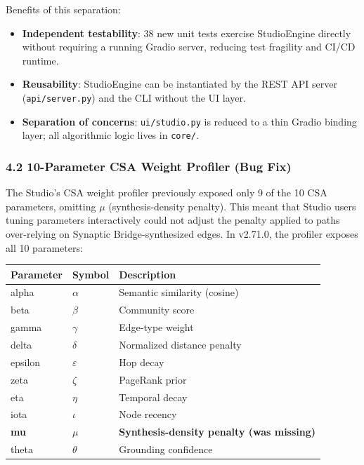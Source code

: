 Benefits of this separation:
\begin{itemize}
  \item \textbf{Independent testability}: 38 new unit tests exercise StudioEngine directly without requiring a running Gradio server, reducing test fragility and CI/CD runtime.
  \item \textbf{Reusability}: StudioEngine can be instantiated by the REST API server (\texttt{api/server.py}) and the CLI without the UI layer.
  \item \textbf{Separation of concerns}: \texttt{ui/studio.py} is reduced to a thin Gradio binding layer; all algorithmic logic lives in \texttt{core/}.
\end{itemize}


\subsubsection*{4.2 10-Parameter CSA Weight Profiler (Bug Fix)}
The Studio's CSA weight profiler previously exposed only 9 of the 10 CSA parameters, omitting $\mu$ (synthesis-density penalty). This meant that Studio users tuning parameters interactively could not adjust the penalty applied to paths over-relying on Synaptic Bridge-synthesized edges. In v2.71.0, the profiler exposes all 10 parameters:

\begin{table}[h]
\small\centering
\begin{tabular}{lll}
\toprule
Parameter & Symbol & Description \\
\midrule
alpha & $\alpha$ & Semantic similarity (cosine) \\
beta & $\beta$ & Community score \\
gamma & $\gamma$ & Edge-type weight \\
delta & $\delta$ & Normalized distance penalty \\
epsilon & $\varepsilon$ & Hop decay \\
zeta & $\zeta$ & PageRank prior \\
eta & $\eta$ & Temporal decay \\
iota & $\iota$ & Node recency \\
\textbf{mu} & \textbf{$\mu$} & \textbf{Synthesis-density penalty (was missing)} \\
theta & $\theta$ & Grounding confidence \\
\bottomrule
\end{tabular}
\end{table}


